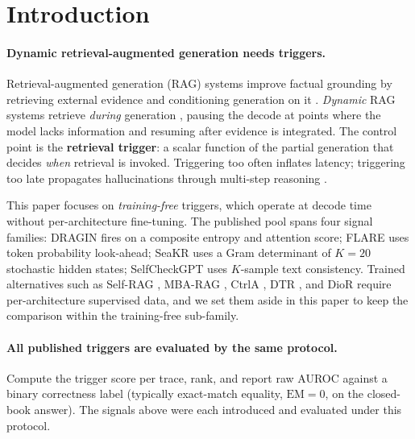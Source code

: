 \documentclass[11pt]{article}
\begin{document}
\section{Introduction}
\label{sec:intro}

\paragraph{Dynamic retrieval-augmented generation needs triggers.}
Retrieval-augmented generation (RAG) systems improve factual grounding by
retrieving external evidence and conditioning generation on it
\citep{Lewis_RAG, Gao_RAGSurvey}. \emph{Dynamic} RAG systems retrieve
\emph{during} generation \citep{Trivedi_IRCoT, Shao_IterRetGen,
Yan_CorrectiveRAG}, pausing the decode at points where the model lacks
information and resuming after evidence is integrated. The control point is
the \textbf{retrieval trigger}: a scalar function of the partial generation
that decides \emph{when} retrieval is invoked. Triggering too often inflates
latency; triggering too late propagates hallucinations through multi-step
reasoning \citep{Su_DRAGIN, Jiang_FLARE}.

This paper focuses on \emph{training-free} triggers, which operate at decode
time without per-architecture fine-tuning. The published pool spans four
signal families: DRAGIN \citep{Su_DRAGIN} fires on a composite entropy and
attention score; FLARE \citep{Jiang_FLARE} uses token probability look-ahead;
SeaKR \citep{Yao_SeaKR} uses a Gram determinant of $K{=}20$
stochastic hidden states; SelfCheckGPT \citep{Manakul_SelfCheckGPT} uses
$K$-sample text consistency. Trained alternatives such as Self-RAG
\citep{Asai_SelfRAG}, MBA-RAG \citep{Tang_MBARAG}, CtrlA \citep{Liu_CtrlA},
DTR \citep{Chen_DTR}, and DioR \citep{Guo_DioR} require per-architecture
supervised data, and we set them aside in this paper to keep the comparison
within the training-free sub-family.

\paragraph{All published triggers are evaluated by the same protocol.}
Compute the trigger score per trace, rank, and report raw AUROC against a
binary correctness label (typically exact-match equality, $\mathrm{EM}=0$, on
the closed-book answer). The signals above were each introduced and evaluated
under this protocol.
\end{document}
